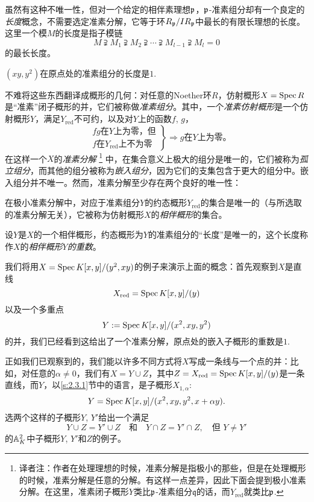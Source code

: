 虽然有这种不唯一性，但对一个给定的相伴素理想$\mathfrak{p}$，$\mathfrak{p}$-准素组分却有一个良定的\textit{长度}概念，不需要选定准素分解，它等于环$R_{\mathfrak{p}}/IR_{\mathfrak{p}}$中最长的有限长理想的长度。这里一个模$M$的长度是指子模链
\[
	M\supsetneqq M_1 \supsetneqq M_2 \supsetneqq \cdots \supsetneqq M_{l-1} \supsetneqq M_l=0
\]
的最长长度。

\begin{exe}
	$(xy,y^2)$在原点处的准素组分的长度是$1$.
\end{exe}

不难将这些东西翻译成概形的几何：对任意的Noether环$R$，仿射概形$X=\operatorname{Spec} R$是“准素”闭子概形的并，它们被称做\textit{准素组分}。其中，一个\textit{准素仿射概形}是一个仿射概形$Y$，满足$Y_{\text{red}}$不可约，以及对$Y$上的函数$f$, $g$，
\[
	\left. 
		\begin{aligned}
			&\text{$fg$在$Y$上为零，但}\\
			&\text{$f$在$Y_{\text{red}}$上不为零}
		\end{aligned}
	\right\} \Rightarrow \text{$g$在$Y$上为零。}
\]
在这样一个$X$的\textit{准素分解}
\footnote{译者注：作者在处理理想的时候，准素分解是指极小的那些，但是在处理概形的时候，准素分解是任意的分解。有这样一点差异，因此下面会提到极小准素分解。在这里，准素闭子概形$Y$类比$\mathfrak{p}$-准素组分$\mathfrak{q}$的话，而$Y_{\text{red}}$就类比$\mathfrak{p}$.}
中，在集合意义上极大的组分是唯一的，它们被称为\textit{孤立组分}，而其他的组分被称为\textit{嵌入组分}，因为它们的支集包含于更大的组分中。嵌入组分并不唯一。然而，准素分解至少存在两个良好的唯一性：
\begin{compactenum}[(1)]
\item 在极小准素分解中，对应于准素组分$Y$的约态概形$Y_{\text{red}}$的集合是唯一的（与所选取的准素分解无关），它被称为仿射概形$X$的\textit{相伴概形}的集合。
\item 设$Y$是$X$的一个相伴概形，约态概形为$Y$的准素组分的“长度”是唯一的，这个长度称作$X$的\textit{相伴概形$Y$的重数}。
\end{compactenum}

我们将用$X=\operatorname{Spec} K[x,y]/(y^2,xy)$的例子来演示上面的概念：首先观察到$X$是直线
\[
	X_{\text{red}}=\operatorname{Spec} K[x,y]/(y)
\]
以及一个多重点
\[
	Y:=\operatorname{Spec} K[x,y]/(x^2,xy,y^2)
\]
的并，我们已经看到这给出了一个准素分解，原点处的嵌入子概形的重数是$1$.

正如我们已观察到的，我们能以许多不同方式将$X$写成一条线与一个点的并：比如，对任意的$\alpha\neq 0$，我们有$X=Y\cup Z$，其中$Z=X_{\text{red}}=\operatorname{Spec} K[x,y]/(y)$是一条直线，而$Y$，以\ref{s:2.3.1}节中的语言，是子概形$X_{1,\alpha}$:
\[
	Y=\operatorname{Spec} K[x,y]/(x^2,xy,y^2,x+\alpha y).
\]
选两个这样的子概形$Y$, $Y'$给出一个满足
\[
	Y\cup Z=Y'\cup Z\quad \text{和}\quad Y\cap Z=Y'\cap Z,\quad \text{但}\,\,Y\neq Y'
\]\label{p:69}
的$\mathbb{A}_K^2$中子概形$Y$, $Y'$和$Z$的例子。

